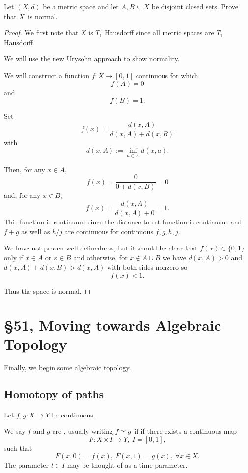 \documentclass[11pt]{article}
\begin{document}
\begin{prob}
    Let $(X,d)$ be a metric space and 
    let $A,B \subseteq X$ be disjoint closed sets. 
    Prove that $X$ is normal. 
\end{prob}
\begin{proof}
    We first note that 
    $X$ is $T_1$ Hausdorff since all 
    metric spaces are $T_1$ Hausdorff. 

    We will use the new Urysohn approach to 
    show normality. 

    We will construct a function 
    $f : X \to [0,1]$ continuous for which 
    \[
        f(A) = 0
    \]
    and 
    \[
        f(B) = 1. 
    \]

    Set 
    \[
        f(x) = \frac{d(x,A)}{d(x,A) + d(x,B)} 
    \]
    with 
    \[
        d(x,A) := \inf_{a \in A} d(x,a). 
    \]

    Then, for any $x \in A$, 
    \[
        f(x) = \frac{0}{0 + d(x,B)} = 0 
    \]
    and, for any $x \in B$, 
    \[
        f(x) = \frac{d(x,A)}{d(x,A) + 0} = 1. 
    \]
    This function is continuous since 
    the distance-to-set function is continuous 
    and $f + g$ as well as $h/j$ are 
    continuous for continuous $f,g,h,j$. 

    We have not proven well-definedness, but 
    it should be clear that 
    $f(x) \in \{0,1\}$ only if 
    $x \in A$ or $x \in B$ and otherwise, for 
    $x \not\in A\cup B$ we have 
    $d(x,A) > 0$ and 
    $d(x,A) + d(x,B) > d(x,A)$ with 
    both sides nonzero so 
    \[
        f(x) < 1.
    \]

    Thus the space is normal. 
\end{proof}

\section{\S 51, Moving towards Algebraic Topology}
Finally, we begin some algebraic topology. 

\subsection{Homotopy of paths}

Let $f,g : X \to Y$ be continuous. 

We say $f$ and $g$ are , 
usually writing $f \simeq g$ if 
if there exists a continuous map 
\[
    F : X \times I \to Y, \ I = [0,1],
\]
such that 
\[
    F(x,0) = f(x), \ F(x,1) = g(x), \ \forall x \in X.  
\]
The parameter $t \in I$ may be thought of as 
a time parameter. 
\end{document}
